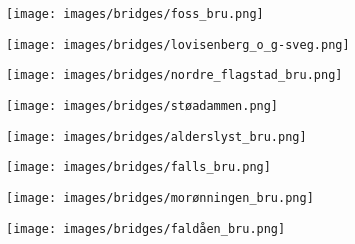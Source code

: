 \begin{figure}[H]
    \centering
    \texttt{[image: images/bridges/foss\_bru.png]}
\end{figure}
            
\begin{figure}[H]
    \centering
    \texttt{[image: images/bridges/lovisenberg\_o\_g-sveg.png]}
\end{figure}
            
\begin{figure}[H]
    \centering
    \texttt{[image: images/bridges/nordre\_flagstad\_bru.png]}
\end{figure}
            
\begin{figure}[H]
    \centering
    \texttt{[image: images/bridges/støadammen.png]}
\end{figure}
            
\begin{figure}[H]
    \centering
    \texttt{[image: images/bridges/alderslyst\_bru.png]}
\end{figure}
            
\begin{figure}[H]
    \centering
    \texttt{[image: images/bridges/falls\_bru.png]}
\end{figure}
            
\begin{figure}[H]
    \centering
    \texttt{[image: images/bridges/morønningen\_bru.png]}
\end{figure}
            
\begin{figure}[H]
    \centering
    \texttt{[image: images/bridges/faldåen\_bru.png]}
\end{figure}
            